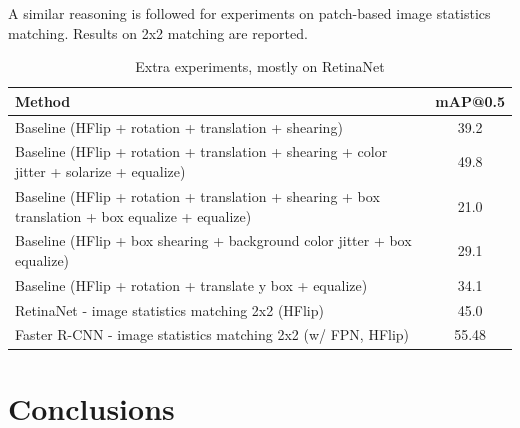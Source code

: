 \documentclass[%
    corpo=12pt,
    twoside,
    stile=classica,   
    tipotesi=magistrale,
    evenboxes,
    english,
	numerazioneromana,
]{toptesi}
\begin{document}
A similar reasoning is followed for experiments on patch-based image statistics matching. Results on 2x2 matching are reported.

\begin{table}[ht!]
	\centering
	\begin{tabularx}{\linewidth}{|X|c|}
		\hline
		Method  &   mAP@0.5 \\
		\hline\hline
		Baseline (HFlip + rotation + translation + shearing)      &   39.2   \\
		\hline
		Baseline (HFlip + rotation + translation + shearing + color jitter + solarize + equalize)      &   49.8   \\
		\hline
		Baseline (HFlip + rotation + translation + shearing + box translation + box equalize + equalize)      &   21.0   \\
		\hline
		Baseline (HFlip + box shearing + background color jitter + box equalize)      &   29.1   \\
		\hline
		Baseline (HFlip + rotation + translate y box + equalize)      &   34.1   \\
		\hline
		RetinaNet - image statistics matching 2x2 (HFlip) &   45.0    \\
		\hline
		Faster R-CNN - image statistics matching 2x2 (w/ FPN, HFlip) &   55.48    \\
		\hline
	\end{tabularx}
	\caption{Extra experiments, mostly on RetinaNet}
	\label{table:extra}
\end{table}

\chapter{Conclusions}


\backmatter
\english
\printbibliography[heading=bibintoc]

\end{document}
